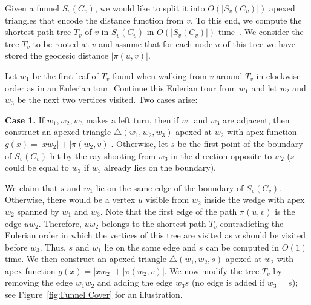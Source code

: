 \documentclass[a4paper,UKenglish]{lipics}
\newcommand{\fn}[2]{\ensuremath{S_{\scriptscriptstyle #1}(#2)}}
\newcommand{\g}[2]{\ensuremath{|\pi(#1, #2)|}}
\newcommand{\p}[2]{\ensuremath{\pi(#1, #2)}}
\begin{document}
Given a funnel $\fn{v}{C_v}$, we would like to split it into $O(|\fn{v}{C_v}|)$ apexed triangles that encode the distance function from $v$.
To this end, we compute the shortest-path tree $T_v$ of $v$ in $\fn{v}{C_v}$ in $O(|\fn{v}{C_v}|)$ time~\cite{guibasShortestPathQueries}.
We consider the tree $T_v$ to be rooted at $v$ and assume that for each node $u$ of this tree 
we have stored the geodesic distance $\g{u}{v}$. 

Let $w_1$ be the first leaf of $T_v$ found when walking from $v$ around $T_v$ in clockwise order as in an Eulerian tour.
Continue this Eulerian tour from $w_1$ and let $w_2$ and $w_3$ be the next two vertices visited. Two cases arise:

\textbf{Case 1.} If $w_1, w_2, w_3$ makes a left turn, then if $w_1$ and $w_3$ are adjacent, then construct an apexed triangle $\triangle(w_1, w_2, w_3)$ apexed at $w_2$ with apex function $g(x) = |x w_2| + \g{w_2}{v}$.
Otherwise, let $s$ be the first point of the boundary of $\fn{v}{C_v}$ hit by the ray shooting from $w_3$ in the direction opposite to $w_2$ ($s$ could be equal to $w_3$ if $w_3$ already lies on the boundary).

We claim that $s$ and $w_1$ lie on the same edge of the boundary of $\fn{v}{C_v}$. 
Otherwise, there would be a vertex $u$ visible from $w_2$ inside the wedge with apex $w_2$ spanned by $w_1$ and $w_3$.
Note that the first edge of the path $\p{u}{v}$ is the edge $uw_2$. Therefore, $uw_2$ belongs to the shortest-path $T_v$ contradicting the Eulerian order in which the vertices of this tree are visited as $u$ should be visited before $w_3$. Thus, $s$ and $w_1$ lie on the same edge and $s$ can be computed in $O(1)$ time.
We then construct an apexed triangle $\triangle(w_1, w_2, s)$ apexed at $w_2$ with apex function $g(x) = |x w_2| + \g{w_2}{v}$.
We now modify the tree $T_v$ by removing the edge $w_1w_2$ and adding the edge $w_3s$ (no edge is added if $w_3 = s$); see Figure~\ref{fig:Funnel Cover} for an illustration.
\end{document}
